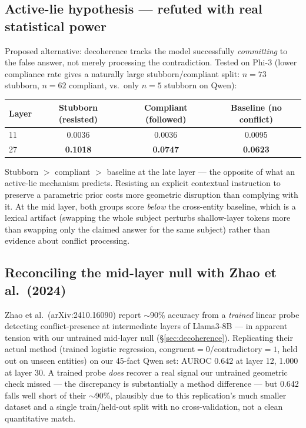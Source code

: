 \documentclass[11pt]{article}
\begin{document}
\subsection{Active-lie hypothesis --- refuted with real statistical power}

Proposed alternative: decoherence tracks the model successfully
\emph{committing} to the false answer, not merely processing the
contradiction. Tested on Phi-3 (lower compliance rate gives a naturally large
stubborn/compliant split: $n=73$ stubborn, $n=62$ compliant, vs.\ only $n=5$
stubborn on Qwen):

\begin{table}[h]
\centering
\begin{tabular}{@{}lccc@{}}
\toprule
Layer & Stubborn (resisted) & Compliant (followed) & Baseline (no conflict) \\
\midrule
11 & 0.0036 & 0.0036 & 0.0095 \\
27 & \textbf{0.1018} & \textbf{0.0747} & \textbf{0.0623} \\
\bottomrule
\end{tabular}
\end{table}

Stubborn $>$ compliant $>$ baseline at the late layer --- the opposite of what
an active-lie mechanism predicts. Resisting an explicit contextual instruction
to preserve a parametric prior costs more geometric disruption than complying
with it. At the mid layer, both groups score \emph{below} the cross-entity
baseline, which is a lexical artifact (swapping the whole subject perturbs
shallow-layer tokens more than swapping only the claimed answer for the same
subject) rather than evidence about conflict processing.

\subsection{Reconciling the mid-layer null with Zhao et al.\ (2024)}

Zhao et al.\ (arXiv:2410.16090) report $\sim$90\% accuracy from a
\emph{trained} linear probe detecting conflict-presence at intermediate
layers of Llama3-8B --- in apparent tension with our untrained mid-layer null
(\S\ref{sec:decoherence}). Replicating their actual method (trained logistic
regression, congruent$=0$/contradictory$=1$, held out on unseen entities) on
our 45-fact Qwen set: AUROC 0.642 at layer 12, 1.000 at layer 30. A trained
probe \emph{does} recover a real signal our untrained geometric check missed
--- the discrepancy is substantially a method difference --- but 0.642 falls
well short of their $\sim$90\%, plausibly due to this replication's much
smaller dataset and a single train/held-out split with no cross-validation,
not a clean quantitative match.
\end{document}
